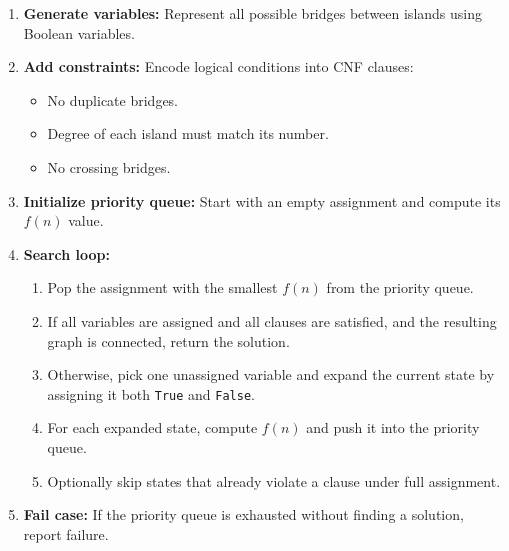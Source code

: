 \begin{enumerate}
  \item \textbf{Generate variables:} Represent all possible bridges between islands using Boolean variables.

  \item \textbf{Add constraints:} Encode logical conditions into CNF clauses:
  \begin{itemize}
    \item No duplicate bridges.
    \item Degree of each island must match its number.
    \item No crossing bridges.
  \end{itemize}

  \item \textbf{Initialize priority queue:} Start with an empty assignment and compute its $f(n)$ value.

  \item \textbf{Search loop:}
  \begin{enumerate}
    \item Pop the assignment with the smallest $f(n)$ from the priority queue.
    \item If all variables are assigned and all clauses are satisfied, and the resulting graph is connected, return the solution.
    \item Otherwise, pick one unassigned variable and expand the current state by assigning it both \texttt{True} and \texttt{False}.
    \item For each expanded state, compute $f(n)$ and push it into the priority queue.
    \item Optionally skip states that already violate a clause under full assignment.
  \end{enumerate}

  \item \textbf{Fail case:} If the priority queue is exhausted without finding a solution, report failure.
\end{enumerate}
